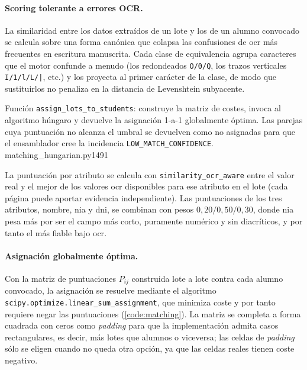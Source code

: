 \paragraph{Scoring tolerante a errores OCR.}
La similaridad entre los datos extraídos de un lote y los de un
alumno convocado se calcula sobre una forma canónica que colapsa las
confusiones de \acs{ocr} más frecuentes en escritura manuscrita.
Cada clase de equivalencia agrupa
caracteres que el motor confunde a menudo (los redondeados
\texttt{O/0/Q}, los trazos verticales \texttt{I/1/l/L/|}, etc.) y
los proyecta al primer carácter de la clase, de modo que sustituirlos
no penaliza en la distancia de Levenshtein subyacente.

%
           {Función \texttt{assign\_lots\_to\_students}: construye la
            matriz de costes, invoca al algoritmo húngaro y devuelve
            la asignación 1-a-1 globalmente óptima. Las parejas cuya
            puntuación no alcanza el umbral se devuelven como no
            asignadas para que el ensamblador cree la incidencia
            \texttt{LOW\_MATCH\_CONFIDENCE}.}%
           {matching_hungarian.py}{1}{49}{1}

La puntuación por atributo se calcula con
\texttt{similarity\_ocr\_aware} entre el valor real y el mejor de los
valores \acs{ocr} disponibles para ese atributo en el lote (cada
página puede aportar evidencia independiente). Las puntuaciones de
los tres atributos, nombre, \acs{nia} y \acs{dni}, se combinan con
pesos \(0{,}20 / 0{,}50 / 0{,}30\), donde \acs{nia} pesa más por ser
el campo más corto, puramente numérico y sin diacríticos, y por
tanto el más fiable bajo \acs{ocr}.

\paragraph{Asignación globalmente óptima.}
Con la matriz de puntuaciones \(P_{ij}\) construida lote a lote
contra cada alumno convocado, la asignación se resuelve mediante el
algoritmo
\texttt{scipy.optimize.linear\_sum\_assignment}, que minimiza coste y
por tanto requiere negar las puntuaciones (\cref{code:matching}). La
matriz se completa a forma cuadrada con ceros como \textit{padding}
para que la implementación admita casos rectangulares, es decir, más lotes que
alumnos o viceversa; las celdas de \textit{padding} sólo se eligen
cuando no queda otra opción, ya que las celdas reales tienen coste
negativo.

